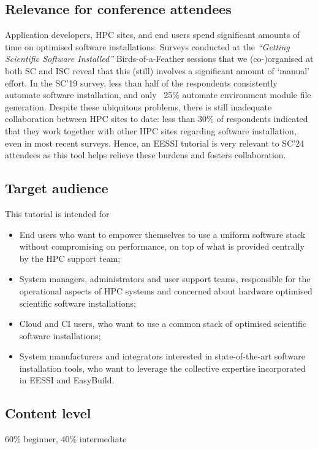 \subsection*{Relevance for conference attendees}

Application developers, HPC sites, and end users %
spend significant amounts of time on optimised software installations. Surveys conducted at the
\emph{``Getting Scientific Software Installed''} Birds-of-a-Feather sessions that we (co-)organised at both SC and ISC
reveal that this (still) involves a significant amount of `manual' effort.
In the SC'19 survey,
less than half of the respondents consistently automate software installation,
and only ~25\% automate environment module file generation.
Despite these ubiquitous problems,
there is still inadequate collaboration
between HPC sites to date: less than 30\% of respondents indicated that they
work together with other HPC sites regarding software installation, even in most recent surveys.
Hence, an EESSI tutorial is very relevant to SC'24 attendees as this tool helps relieve these burdens and fosters
collaboration.

\subsection*{Target audience}
This tutorial is intended for
\begin{itemize}
    \item End users who want to empower themselves to use a uniform software stack without compromising on
          performance, on top of what is provided centrally by the HPC support team;
    \item System managers, administrators and user support teams, responsible for the operational aspects of HPC systems and concerned about
          hardware optimised scientific software installations;
    \item Cloud and CI users, who want to use a common stack of optimised scientific software installations;
    \item System manufacturers and integrators interested in state-of-the-art software installation tools, who want to
          leverage the collective expertise incorporated in EESSI and EasyBuild.
\end{itemize}

\subsection*{Content level}
60\% beginner, 40\% intermediate


